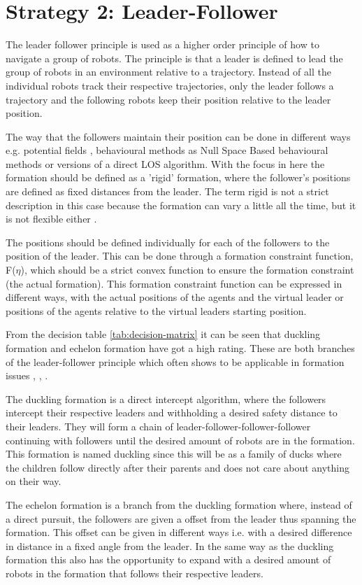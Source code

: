 \section{Strategy 2: Leader-Follower}

The leader follower principle is used as a higher order principle of how to navigate a group of robots. The principle is that a leader is defined to lead the group of robots in an environment relative to a trajectory. Instead of all the individual robots track their respective trajectories, only the leader follows a trajectory and the following robots keep their position relative to the leader position.

The way that the followers maintain their position can be done in different ways e.g. potential fields \citep{pfmrm}, behavioural methods as Null Space Based behavioural methods \citep{arrichiello2006formation} or versions of a direct \ac{LOS} algorithm. With the focus in here the formation should be defined as a 'rigid' formation, where the follower's positions are defined as fixed distances from the leader. The term rigid is not a strict description in this case because the formation can vary a little all the time, but it is not flexible either \citep{976029}.

The positions should be defined individually for each of the followers to the position of the leader. This can be done through a formation constraint function, F($\eta$), which should be a strict convex function to ensure the formation constraint (the actual formation). This formation constraint function can be expressed in different ways, with the actual positions of the agents and the virtual leader or positions of the agents relative to the virtual leaders starting position.

From the decision table \ref{tab:decision-matrix} it can be seen that duckling formation and echelon formation have got a high rating. These are both branches of the leader-follower principle which often shows to be applicable in formation issues \citep{TKP04}, \citep{1013687}, \citep{976029}.

The duckling formation is a direct intercept algorithm, where the followers intercept their respective leaders and withholding a desired safety distance to their leaders. They will form a chain of leader-follower-follower-follower continuing with followers until the desired amount of robots are in the formation. This formation is named duckling since this will be as a family of ducks where the children follow directly after their parents and does not care about anything on their way.

The echelon formation is a branch from the duckling formation where, instead of a direct pursuit, the followers are given a offset from the leader thus spanning the formation. This offset can be given in different ways i.e. with a desired difference in distance in a fixed angle from the leader. In the same way as the duckling formation this also has the opportunity to expand with a desired amount of robots in the formation that follows their respective leaders.